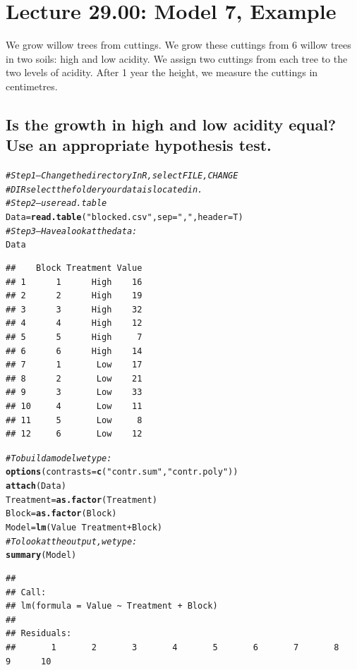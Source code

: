 \documentclass[oneside]{book}\usepackage[]{graphicx}\usepackage[dvipsnames,table,xcdraw]{xcolor}
\makeatletter
\newcommand{\hlstr}[1]{\textcolor[rgb]{0.192,0.494,0.8}{#1}}%
\newcommand{\hlcom}[1]{\textcolor[rgb]{0.678,0.584,0.686}{\textit{#1}}}%
\newcommand{\hlopt}[1]{\textcolor[rgb]{0,0,0}{#1}}%
\newcommand{\hlstd}[1]{\textcolor[rgb]{0.345,0.345,0.345}{#1}}%
\newcommand{\hlkwb}[1]{\textcolor[rgb]{0.69,0.353,0.396}{#1}}%
\newcommand{\hlkwc}[1]{\textcolor[rgb]{0.333,0.667,0.333}{#1}}%
\newcommand{\hlkwd}[1]{\textcolor[rgb]{0.737,0.353,0.396}{\textbf{#1}}}%
\newenvironment{kframe}{%
 \def\at@end@of@kframe{}%
 \ifinner\ifhmode%
  \def\at@end@of@kframe{\end{minipage}}%
  \begin{minipage}{\columnwidth}%
 \fi\fi%
 \def\FrameCommand##1{\hskip\@totalleftmargin \hskip-\fboxsep
 \colorbox{shadecolor}{##1}\hskip-\fboxsep
     \hskip-\linewidth \hskip-\@totalleftmargin \hskip\columnwidth}%
 \MakeFramed {\advance\hsize-\width
   \@totalleftmargin\z@ \linewidth\hsize
   \@setminipage}}%
 {\par\unskip\endMakeFramed%
 \at@end@of@kframe}
\newenvironment{knitrout}{}{} %
\makeatother
\begin{document}
\section{Lecture 29.00: Model 7, Example}
We grow willow trees from cuttings. We grow these cuttings from 6 willow trees in
two soils: high and low acidity. We assign two cuttings from each tree to the two levels of
acidity. After 1 year the height, we measure the cuttings in centimetres.
\subsection*{Is the growth in high and low acidity equal? Use an appropriate hypothesis test.}
\begin{knitrout}
\color{fgcolor}\begin{kframe}
\begin{alltt}
\hlcom{# Step 1 – Change the directory In R, select FILE, CHANGE}
\hlcom{# DIR select the folder your data is located in.}
\hlcom{# Step 2 – use read.table}
\hlstd{Data} \hlkwb{=} \hlkwd{read.table}\hlstd{(}\hlstr{"blocked.csv"}\hlstd{,} \hlkwc{sep} \hlstd{=} \hlstr{","}\hlstd{,} \hlkwc{header} \hlstd{= T)}
\hlcom{# Step 3 – Have a look at the data:}
\hlstd{Data}
\end{alltt}
\begin{verbatim}
##    Block Treatment Value
## 1      1      High    16
## 2      2      High    19
## 3      3      High    32
## 4      4      High    12
## 5      5      High     7
## 6      6      High    14
## 7      1       Low    17
## 8      2       Low    21
## 9      3       Low    33
## 10     4       Low    11
## 11     5       Low     8
## 12     6       Low    12
\end{verbatim}
\begin{alltt}
\hlcom{# To build a model we type:}
\hlkwd{options}\hlstd{(}\hlkwc{contrasts} \hlstd{=} \hlkwd{c}\hlstd{(}\hlstr{"contr.sum"}\hlstd{,} \hlstr{"contr.poly"}\hlstd{))}
\hlkwd{attach}\hlstd{(Data)}
\hlstd{Treatment} \hlkwb{=} \hlkwd{as.factor}\hlstd{(Treatment)}
\hlstd{Block} \hlkwb{=} \hlkwd{as.factor}\hlstd{(Block)}
\hlstd{Model} \hlkwb{=} \hlkwd{lm}\hlstd{(Value} \hlopt{~} \hlstd{Treatment} \hlopt{+} \hlstd{Block)}
\hlcom{# To look at the output, we type:}
\hlkwd{summary}\hlstd{(Model)}
\end{alltt}
\begin{verbatim}
## 
## Call:
## lm(formula = Value ~ Treatment + Block)
## 
## Residuals:
##       1       2       3       4       5       6       7       8       9      10 

\end{verbatim}
\end{kframe}
\end{knitrout}
\end{document}
